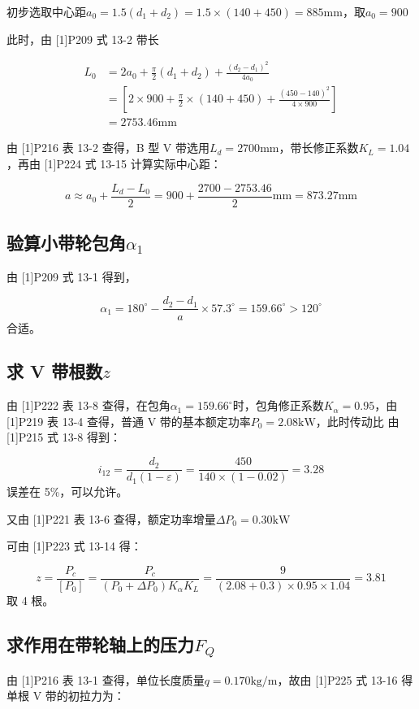 \documentclass[12pt]{ctexart}
\begin{document}
初步选取中心距$a_0=1.5(d_1+d_2)=1.5\times (140+450)=885\text{mm}$，取$a_0=900$

此时，由 [1]P209 式 13-2 带长

\begin{align*}
    L_0 & =2a_0+\frac{\pi}{2}(d_1+d_2)+\frac{(d_2-d_1)^2}{4a_0} \\
    & =\left[2\times 900 + \frac{\pi}{2}\times (140+450)+\frac{(450-140)^2}{4\times 900}\right]\\
    & =2753.46\text{mm}
\end{align*}

由 [1]P216 表 13-2 查得，B 型 V 带选用$L_d=2700\text{mm}$，带长修正系数$K_L=1.04$，再由 [1]P224 式 13-15 计算实际中心距：

$$a \approx a_0 + \frac{L_d-L_0}{2}=900 + \frac{2700-2753.46}{2}\text{mm}=873.27\text{mm}$$

\subsection{验算小带轮包角$\alpha_1$}

由 [1]P209 式 13-1 得到，

$$\alpha_1=180^\circ -\frac{d_2-d_1}{a}\times 57.3^\circ =159.66^\circ > 120^\circ $$
合适。

\subsection{求 V 带根数$z$}

由 [1]P222 表 13-8 查得，在包角$\alpha_1=159.66^\circ$时，包角修正系数$K_\alpha = 0.95$，由 [1]P219 表 13-4 查得，普通 V 带的基本额定功率$P_0 = 2.08\text{kW}$，此时传动比 由 [1]P215 式 13-8 得到：

$$i_{12}=\frac{d_2}{d_1(1-\varepsilon)}=\frac{450}{140\times (1-0.02)}=3.28$$误差在 5\%，可以允许。

又由 [1]P221 表 13-6 查得，额定功率增量$\Delta P_0=0.30\text{kW}$

可由 [1]P223 式 13-14 得：

$$z =\frac{P_c}{[P_0]} = \frac{P_c}{(P_0+\Delta P_0)K_\alpha K_L}=\frac{9}{(2.08+0.3)\times 0.95\times 1.04}=3.81$$取 4 根。

\subsection{求作用在带轮轴上的压力$F_Q$}

由 [1]P216 表 13-1 查得，单位长度质量$q=0.170\text{kg/m}$，故由 [1]P225 式 13-16 得单根 V 带的初拉力为：
\end{document}
